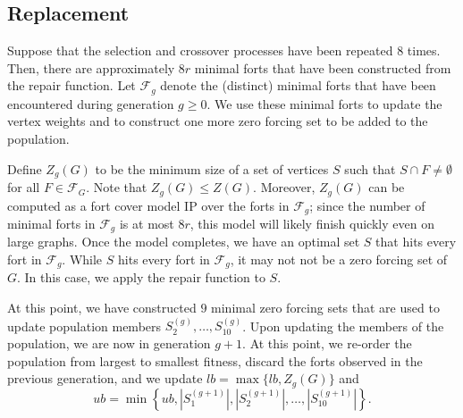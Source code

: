 \documentclass[11pt]{article}
\newcommand\abs[1]{\left|#1\right|}
\begin{document}
\subsection{Replacement}
Suppose that the selection and crossover processes have been repeated $8$ times.
Then, there are approximately $8r$ minimal forts that have been constructed from the repair function. 
Let $\mathcal{F}_{g}$ denote the (distinct) minimal forts that have been encountered during generation $g\geq 0$. 
We use these minimal forts to update the vertex weights and to construct one more zero forcing set to be added to the population.

Define $Z_{g}(G)$ to be the minimum size of a set of vertices $S$ such that $S\cap F\neq\emptyset$ for all $F\in\mathcal{F}_{G}$. 
Note that $Z_{g}(G)\leq Z(G)$.
Moreover, $Z_{g}(G)$ can be computed as a fort cover model IP over the forts in $\mathcal{F}_{g}$; since the number of minimal forts in $\mathcal{F}_{g}$ is at most $8r$, this model will likely finish quickly even on large graphs.
Once the model completes, we have an optimal set $S$ that hits every fort in $\mathcal{F}_{g}$.
While $S$ hits every fort in $\mathcal{F}_{g}$, it may not not be a zero forcing set of $G$. 
In this case, we apply the repair function to $S$.

At this point, we have constructed $9$ minimal zero forcing sets that are used to update population members $S_{2}^{(g)},\ldots,S_{10}^{(g)}$. 
Upon updating the members of the population, we are now in generation $g+1$.
At this point, we re-order the population from largest to smallest fitness, discard the forts observed in the previous generation, and we update $lb=\max\{lb,Z_{g}(G)\}$ and 
\[
ub = \min\left\{ub,\abs{S_{1}^{(g+1)}},\abs{S_{2}^{(g+1)}},\ldots,\abs{S_{10}^{(g+1)}}\right\}.
\]
\end{document}
